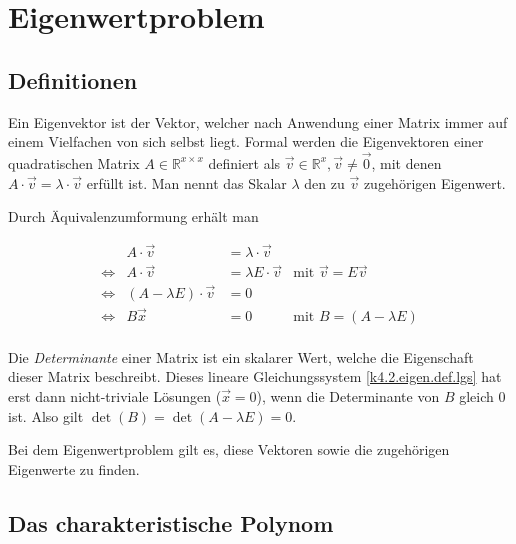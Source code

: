 \documentclass[]{dsadokumentation}
\begin{document}

\section{Eigenwertproblem}

\subsection{Definitionen}\label{k4.2.eigen.def}

Ein Eigenvektor ist der Vektor, welcher nach Anwendung einer Matrix immer auf einem Vielfachen von sich selbst liegt. 
Formal werden die Eigenvektoren einer quadratischen Matrix $A \in \mathbb{R}^{x \times x}$ definiert als $\vec{v} \in \mathbb{R}^{x}, \vec{v} \neq \vec{0}$, mit denen $A \cdot \vec{v} = \lambda \cdot \vec{v}$ erfüllt ist. Man nennt das Skalar $\lambda$ den zu $\vec{v}$ zugehörigen Eigenwert. 

Durch Äquivalenzumformung erhält man

\begin{equation}
  \label{k4.2.eigen.def.lgs}
  \begin{aligned}
    && A \cdot \vec{v} &= \lambda \cdot \vec{v} && \\
    &\Leftrightarrow& A \cdot \vec{v} &= \lambda E \cdot \vec{v} &\text{mit } \vec{v} = E\vec{v}& \\
    &\Leftrightarrow& (A - \lambda E) \cdot \vec{v} &= 0 && \\
    &\Leftrightarrow& B\vec{x} &= 0  \quad \quad &\text{mit } B = (A - \lambda E)&  \\ 
  \end{aligned}
\end{equation}

Die \textit{Determinante} einer Matrix ist ein skalarer Wert, welche die Eigenschaft dieser Matrix beschreibt. Dieses lineare Gleichungssystem \cref{k4.2.eigen.def.lgs} hat erst dann nicht-triviale Lösungen ($\vec{x} = 0$), wenn die Determinante von $B$ gleich $0$ ist. Also gilt $\det (B) = \det (A - \lambda E) = 0$. 

Bei dem Eigenwertproblem gilt es, diese Vektoren sowie die zugehörigen Eigenwerte zu finden. 


\subsection{Das charakteristische Polynom}
\end{document}
